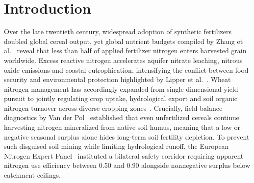 \documentclass[11pt,a4paper]{article}
\begin{document}
\section{Introduction}

Over the late twentieth century, widespread adoption of synthetic fertilizers doubled global cereal output, yet global nutrient budgets compiled by Zhang et al.~\citep{zhang2015} reveal that less than half of applied fertilizer nitrogen enters harvested grain worldwide. Excess reactive nitrogen accelerates aquifer nitrate leaching, nitrous oxide emissions and coastal eutrophication, intensifying the conflict between food security and environmental protection highlighted by Lipper et al.~\citep{lipper2014}. Wheat nitrogen management has accordingly expanded from single-dimensional yield pursuit to jointly regulating crop uptake, hydrological export and soil organic nitrogen turnover across diverse cropping zones~\citep{chen2014}. Crucially, field balance diagnostics by Van der Pol~\citep{vanderpol1992} established that even unfertilized cereals continue harvesting nitrogen mineralized from native soil humus, meaning that a low or negative seasonal surplus alone hides long-term soil fertility depletion. To prevent such disguised soil mining while limiting hydrological runoff, the European Nitrogen Expert Panel~\citep{eunep2015} instituted a bilateral safety corridor requiring apparent nitrogen use efficiency between 0.50 and 0.90 alongside nonnegative surplus below catchment ceilings.
\end{document}
